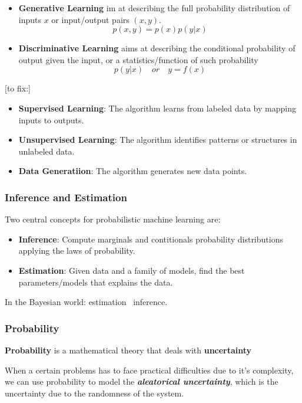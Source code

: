 \begin{itemize}
    \item \textbf{Generative Learning} im at describing the full probability distribution of inputs $x$ or input/output pairs $(x, y)$.
    $$
    p(x,y) = p(x)p(y|x)
    $$

    \item \textbf{Discriminative Learning} aims at describing the conditional probability of output given the input, or a statistics/function of such probability
    $$
    p(y|x) \quad or \quad y = f(x)
    $$
\end{itemize}

[to fix:]
\begin{itemize}
    \item \textbf{Supervised Learning}: The algorithm learns from labeled data by mapping inputs to outputs.
    \item \textbf{Unsupervised Learning}: The algorithm identifies patterns or structures in unlabeled data.
    \item \textbf{Data Generatiion}: The algorithm generates new data points.
\end{itemize}

\subsubsection{Inference and Estimation}

Two central concepts for probabilistic machine learning are:

\begin{itemize}
    \item \textbf{Inference}: Compute marginals and contitionals probability distributions applying the laws of probability. 
    \item \textbf{Estimation}: Given data and a family of models, find the best parameters/models that explains the data.
\end{itemize}

In the Bayesian world: estimation \approx \ inference.

\subsubsection{Probability}

\textbf{Probability} is a mathematical theory that deals with \textbf{uncertainty}

When a certain problems has to face practical difficulties due to it's complexity, we can use probability to model the \textbf{\textit{aleatorical uncertainty}}, which is the uncertainty due to the randomness of the system. 

